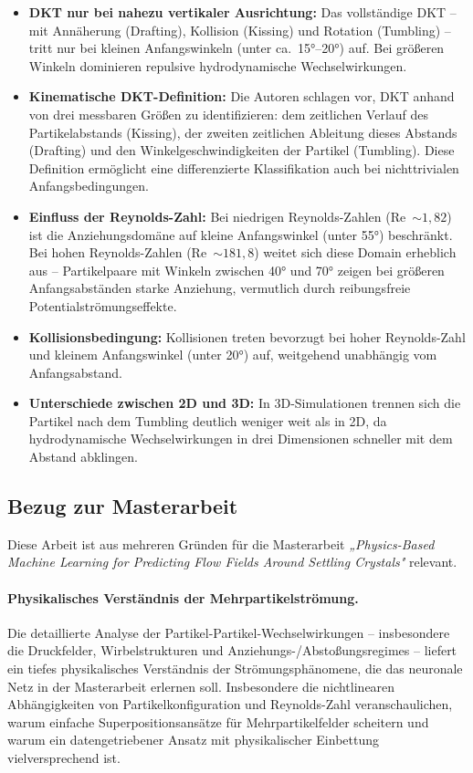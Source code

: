 \documentclass[a4paper,12pt]{article}
\begin{document}
\begin{itemize}
    \item \textbf{DKT nur bei nahezu vertikaler Ausrichtung:} Das vollständige DKT -- mit Annäherung (Drafting), Kollision (Kissing) und Rotation (Tumbling) -- tritt nur bei kleinen Anfangswinkeln (unter ca.\ 15°--20°) auf. Bei größeren Winkeln dominieren repulsive hydrodynamische Wechselwirkungen.

    \item \textbf{Kinematische DKT-Definition:} Die Autoren schlagen vor, DKT anhand von drei messbaren Größen zu identifizieren: dem zeitlichen Verlauf des Partikelabstands (Kissing), der zweiten zeitlichen Ableitung dieses Abstands (Drafting) und den Winkelgeschwindigkeiten der Partikel (Tumbling). Diese Definition ermöglicht eine differenzierte Klassifikation auch bei nichttrivialen Anfangsbedingungen.

    \item \textbf{Einfluss der Reynolds-Zahl:} Bei niedrigen Reynolds-Zahlen (Re~$\sim 1{,}82$) ist die Anziehungsdomäne auf kleine Anfangswinkel (unter 55°) beschränkt. Bei hohen Reynolds-Zahlen (Re~$\sim 181{,}8$) weitet sich diese Domain erheblich aus -- Partikelpaare mit Winkeln zwischen 40° und 70° zeigen bei größeren Anfangsabständen starke Anziehung, vermutlich durch reibungsfreie Potentialströmungseffekte.

    \item \textbf{Kollisionsbedingung:} Kollisionen treten bevorzugt bei hoher Reynolds-Zahl und kleinem Anfangswinkel (unter 20°) auf, weitgehend unabhängig vom Anfangsabstand.

    \item \textbf{Unterschiede zwischen 2D und 3D:} In 3D-Simulationen trennen sich die Partikel nach dem Tumbling deutlich weniger weit als in 2D, da hydrodynamische Wechselwirkungen in drei Dimensionen schneller mit dem Abstand abklingen.
\end{itemize}

\subsection*{Bezug zur Masterarbeit}

Diese Arbeit ist aus mehreren Gründen für die Masterarbeit \emph{„Physics-Based Machine Learning for Predicting Flow Fields Around Settling Crystals"} relevant.

\paragraph{Physikalisches Verständnis der Mehrpartikelströmung.}
Die detaillierte Analyse der Partikel-Partikel-Wechselwirkungen -- insbesondere die Druckfelder, Wirbelstrukturen und Anziehungs-/Abstoßungsregimes -- liefert ein tiefes physikalisches Verständnis der Strömungsphänomene, die das neuronale Netz in der Masterarbeit erlernen soll. Insbesondere die nichtlinearen Abhängigkeiten von Partikelkonfiguration und Reynolds-Zahl veranschaulichen, warum einfache Superpositionsansätze für Mehrpartikelfelder scheitern und warum ein datengetriebener Ansatz mit physikalischer Einbettung vielversprechend ist.
\end{document}
